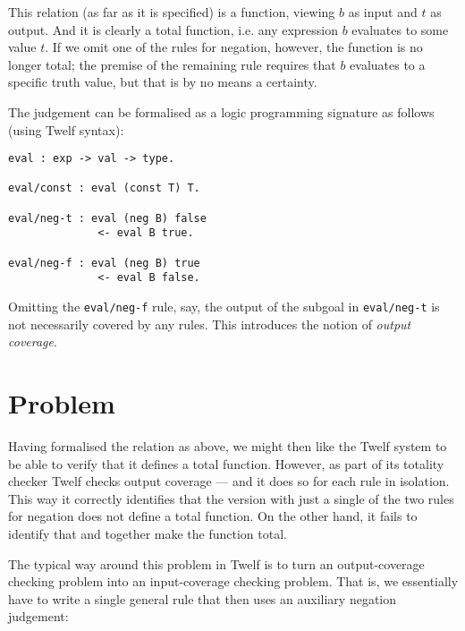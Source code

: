 \documentclass[12pt]{article}
\begin{document}
This relation (as far as it is specified) is a function, viewing $b$ as input and $t$ as output.
And it is clearly a total function, i.e. any expression $b$ evaluates to some value $t$.
If we omit one of the rules for negation, however, the function is no longer total;
the premise of the remaining rule requires that $b$ evaluates to a specific truth value, but that is by no means a certainty.

The judgement can be formalised as a logic programming signature as follows (using Twelf syntax):
\begin{center}
\begin{BVerbatim}
eval : exp -> val -> type.

eval/const : eval (const T) T.

eval/neg-t : eval (neg B) false
              <- eval B true.

eval/neg-f : eval (neg B) true
              <- eval B false.
\end{BVerbatim}
\end{center}
Omitting the \texttt{eval/neg-f} rule, say, the output of the subgoal in \texttt{eval/neg-t} is not necessarily covered by any rules.
This introduces the notion of \textit{output coverage}.

\section*{Problem}

Having formalised the relation as above, we might then like the Twelf system to be able to verify that it defines a total function.
However, as part of its totality checker Twelf checks output coverage --- and it does so for each rule in isolation.
This way it correctly identifies that the version with just a single of the two rules for negation does not define a total function.
On the other hand, it fails to identify that  and  together make the function total.

The typical way around this problem in Twelf is to turn an output-coverage checking problem into an input-coverage checking problem.
That is, we essentially have to write a single general  rule that then uses an auxiliary negation judgement:

\begin{prooftree}
\end{prooftree}
\end{document}
